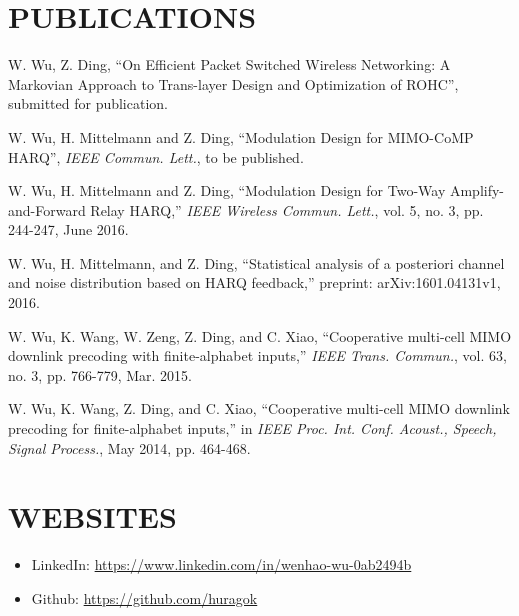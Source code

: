 \documentclass[margin]{res} %
\begin{document}
\begin{resume}
        
    
        \section{PUBLICATIONS}
        \begin{enumerate}[label={[\arabic*]}]
          \item W. Wu, Z. Ding, ``On Efficient Packet Switched
          Wireless Networking: A Markovian Approach to Trans-layer Design and
          Optimization of ROHC'', submitted for publication.
          \item W. Wu, H. Mittelmann and Z. Ding, ``Modulation Design for
          MIMO-CoMP HARQ'', \emph{IEEE Commun. Lett.}, to be published.
          \item W. Wu, H. Mittelmann and Z. Ding, ``Modulation Design for
          Two-Way Amplify-and-Forward Relay HARQ,'' \emph{IEEE Wireless
          Commun. Lett.}, vol. 5, no. 3, pp. 244-247, June 2016.
          \item W. Wu, H. Mittelmann, and Z. Ding, ``Statistical analysis of a
          posteriori channel and noise distribution based on HARQ feedback,”
          preprint: arXiv:1601.04131v1, 2016.
          \item W. Wu, K. Wang, W. Zeng, Z. Ding, and C. Xiao,
          ``Cooperative multi-cell MIMO downlink precoding with
          finite-alphabet inputs,'' \emph{IEEE Trans. Commun.}, vol. 63, no.
          3, pp. 766-779, Mar. 2015.
          \item W. Wu, K. Wang, Z. Ding, and C. Xiao, ``Cooperative multi-cell
          MIMO downlink precoding for finite-alphabet inputs,'' in
          \emph{IEEE Proc. Int. Conf. Acoust., Speech, Signal Process.}, May
          2014, pp. 464-468.
        \end{enumerate}
    
    
        \section{WEBSITES} 
        \begin{itemize}
            \item LinkedIn: \url{https://www.linkedin.com/in/wenhao-wu-0ab2494b}
            \item Github: \url{https://github.com/huragok}
        \end{itemize}
        

\end{resume}
\end{document}
